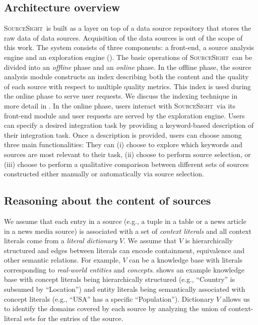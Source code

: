 \documentclass{sig-alternate-05-2015}
\newcommand\system{\textsc{SourceSight}}
\begin{document}
\subsection{Architecture overview}
\system~is built as a layer on top of a data source repository that stores the raw data of data sources. Acquisition of the data sources is out of the scope of this work. The system consists of three components: a front-end, a source analysis engine and an exploration engine (). 
The basic operations of \system~can be divided into an {\em offline} phase and an {\em online} phase. In the offline phase, the source analysis module constructs an index describing both the content and the quality of each source with respect to multiple quality metrics. This index is used during the online phase to serve user requests. We discuss the indexing technique in more detail in . In the online phase, users interact with \system~via its front-end module and user requests are served by the exploration engine. Users can specify a desired integration task by providing a keyword-based description of their integration task. Once a description is provided, users can choose among three main functionalities: They can (i) choose to explore which keywords and sources are most relevant to their task, (ii) choose to perform source selection, or (iii) choose to perform a qualitative comparison between different sets of sources constructed either manually or automatically via source selection. 

\subsection{Reasoning about the content of sources}
\label{sec:reasoning}
We assume that each entry in a source (e.g., a tuple in a table or a news article in a news media source) is associated with a set of {\em context literals} and all context literals come from a {\em literal dictionary} $V$. We assume that $V$ is hierarchically structured and edges between literals can encode containment, equivalence and other semantic relations. For example, $V$ can be a knowledge base with literals corresponding to {\em real-world entities} and {\em concepts}.  shows an example knowledge base with concept literals being hierarchically structured (e.g., ``Country'' is subsumed by ``Location'') and entity literals being semantically associated with concept literals (e.g., ``USA'' has a specific ``Population''). Dictionary $V$ allows us to identify the domains covered by each source by analyzing the union of context-literal sets for the entries of the source. 
\end{document}
